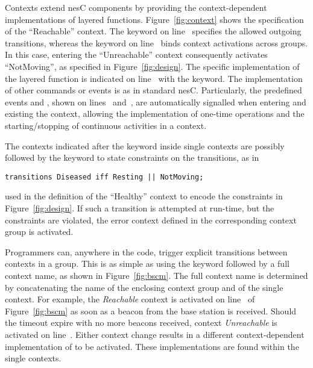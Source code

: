 Contexts extend nesC components by providing the context-dependent
implementations of layered functions.  Figure~\ref{fig:context} shows
the \conesc specification of the ``Reachable'' context. The keyword
 on line~ specifies the allowed
outgoing transitions, whereas the keyword  on
line~ binds context activations across groups. In
this case, entering the ``Unreachable'' context consequently activates
``NotMoving'', as specified in Figure~\ref{fig:design}. The specific
implementation of the layered function is indicated on
line~ with the  keyword.  The
implementation of other commands or events is as in standard
nesC. Particularly, the predefined events  and
, shown on lines~
and~, are automatically signalled when entering
and existing the context, allowing the implementation of one-time
operations and the starting/stopping of continuous activities in a
context.

The contexts indicated after the  keyword inside
single contexts are possibly followed by the  keyword to
state constraints on the transitions, as in
\begin{lstlisting}[language=conesc]
transitions Diseased iff Resting || NotMoving;
\end{lstlisting}
used in the definition of the ``Healthy'' context to encode the
constraints in Figure~\ref{fig:design}. If such a transition is
attempted at run-time, but the constraints are violated, the error
context defined in the corresponding context group is activated. 



Programmers can, anywhere in the code, trigger explicit transitions
between contexts in a group. This is as simple as using the
 keyword followed by a full context name, as shown in
Figure~\ref{fig:bscm}. The full context name is determined by
concatenating the name of the enclosing context group and of the
single context. For example, the \emph{Reachable} context is activated
on line~ of Figure~\ref{fig:bscm} as soon as a beacon
from the base station is received. Should the timeout expire with no
more beacons received, context \emph{Unreachable} is activated on
line~. Either context change results in a different
context-dependent implementation of  to be
activated. These implementations are found within the single contexts.

